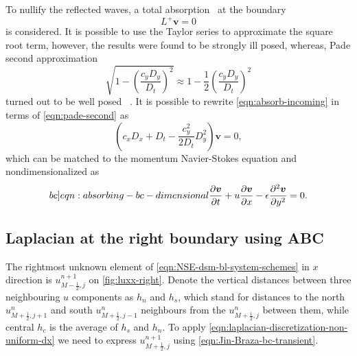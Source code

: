 \documentclass{article}
\numberwithin{equation}{section}
\begin{document}
To nullify the reflected waves, a total absorption~\cite{Engquist:1977} at the boundary
\begin{equation}\label{eqn:absorb-incoming}
	L^+\boldsymbol{v}=0
\end{equation}
is considered. It is possible to use the Taylor series to approximate the square root term, however, the results were found to be strongly ill posed, whereas, Pade second approximation
\begin{equation}\label{eqn:pade-second}
	\sqrt{1-\left( \frac{c_y D_y}{D_t}\right)^2}\approx1-\frac{1}{2}\left( \frac{c_y D_y}{D_t}\right)^2
\end{equation}
turned out to be well posed~\cite{Engquist:1977,Kreiss:1970} . It is possible to rewrite \cref{eqn:absorb-incoming} in terms of \cref{eqn:pade-second} as
\begin{equation*}
	\left( c_xD_x + D_t - \frac{c^2_y}{2D_t}D_y^2 \right)\boldsymbol{v}=0,
\end{equation*}
which can be matched to the momentum Navier-Stokes equation and nondimensionalized as
\begin{equation}\label[bc]{eqn:absorbing-bc-dimensional}
	\frac{\partial \boldsymbol{v}}{\partial t} + u\frac{\partial \boldsymbol{v}}{\partial x}-\epsilon\frac{\partial ^2 \boldsymbol{v}}{\partial y^2}=0.
\end{equation}


\pagebreak
\subsection{Laplacian at the right boundary using ABC}\label{subsec:laplacian-ABC}

The rightmost unknown element of \cref{eqn:NSE-dsm-bl-system-schemes} in $x$ direction is $u^{n+1}_{M-\frac{1}{2},j}$ on \cref{fig:luxx-right}. Denote the vertical distances between three neighbouring $u$ components as $h_n$ and $h_s$, which stand for distances to the north $u^n_{M+\frac{1}{2},j+1}$ and south $u^{n}_{M+\frac{1}{2},j-1}$ neighbours from the $u^{n}_{M+\frac{1}{2},j}$ between them, while central $h_c$ is the average of $h_s$ and $h_n$.  To apply \cref{eqn:laplacian-discretization-non-uniform-dx} we need to express $u^{n+1}_{M+\frac{1}{2},j}$ using \cref{eqn:Jin-Braza-bc-transient}.
\end{document}
